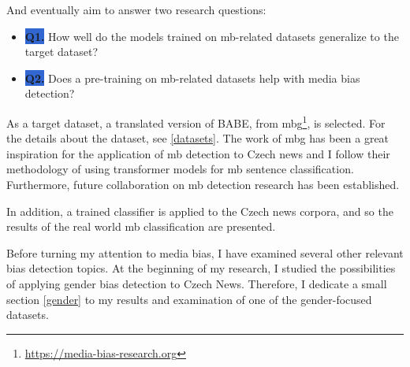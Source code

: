 \noindent And eventually aim to answer two research questions:
\begin{itemize}
    \item[] \colorbox{highlight}{\textbf{Q1.}\label{Q1}} How well do the models trained on \gls{mb}-related datasets generalize to the target dataset?
    \item[] \colorbox{highlight}{\textbf{Q2.}\label{Q2}} Does a pre-training on \gls{mb}-related datasets help with media bias detection?
\end{itemize}

As a target dataset, a translated version of BABE, from \gls{mbg}\footnote{\url{https://media-bias-research.org}}, is selected. For the details about the dataset, see \ref{datasets}. The work of \gls{mbg} has been a great inspiration for the application of \gls{mb} detection to Czech news and I follow their methodology of using transformer models for \gls{mb} sentence classification. Furthermore, future collaboration on \gls{mb} detection research has been established.

In addition, a trained classifier is applied to the Czech news corpora, and so the results of the real world \gls{mb} classification are presented.

Before turning my attention to media bias, I have examined several other relevant bias detection topics. At the beginning of my research, I studied the possibilities of applying gender bias detection to Czech News. Therefore, I dedicate a small section \ref{gender} to my results and examination of one of the gender-focused datasets.


\let\cleardoublepage\clearpage